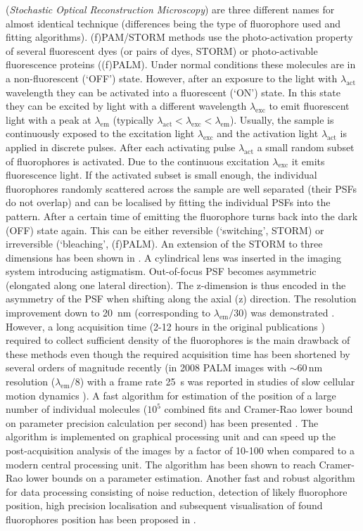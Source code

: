 (\emph{Stochastic Optical Reconstruction Microscopy}) \citep{Rust2006_STORM} are three different names for almost identical technique (differences being the type of fluorophore used and fitting algorithms). (f)PAM/STORM methods use the photo-activation property of several fluorescent dyes (or pairs of dyes, STORM) or photo-activable fluorescence proteins ((f)PALM). Under normal conditions these molecules are in a non-fluorescent (`OFF') state. However, after an exposure to the light with $\lambda_{\mathrm{act}}$ wavelength they can be activated into a fluorescent (`ON') state. In this state they can be excited by light with a different wavelength $\lambda_{\mathrm{exc}}$ to emit fluorescent light with a peak at $\lambda_{\mathrm{em}}$ (typically $\lambda_{\mathrm{act}}<\lambda_{\mathrm{exc}}<\lambda_{\mathrm{em}}$). Usually, the sample is continuously exposed to the excitation light $\lambda_{\mathrm{exc}}$ and the activation light $\lambda_{\mathrm{act}}$ is applied in discrete pulses. After each activating pulse $\lambda_{\mathrm{act}}$ a small random subset of fluorophores is activated. Due to the continuous excitation $\lambda_{\mathrm{exc}}$ it emits fluorescence light. If the activated subset is small enough, the individual fluorophores randomly scattered across the sample are well separated (their PSFs do not overlap) and can be localised by fitting the individual PSFs into the pattern. After a certain time of emitting the fluorophore turns back into the dark (OFF) state again. This can be either reversible (`switching', STORM) or irreversible (`bleaching', (f)PALM). An extension of the STORM to three dimensions has been shown in \citep{Huang2008}. A cylindrical lens was inserted in the imaging system introducing astigmatism. Out-of-focus PSF becomes asymmetric (elongated along one lateral direction). The z-dimension is thus encoded in the asymmetry of the PSF when shifting along the axial (z) direction. The resolution improvement down to 20~nm (corresponding to $\lambda_{\mathrm{em}}/30$) was demonstrated \citep{Betzig2006,Rust2006_STORM}. However, a long acquisition time (2-12 hours in the original publications \citep{Betzig2006}) required to collect sufficient density of the fluorophores is the main drawback of these methods even though the required acquisition time has been shortened by several orders of magnitude recently (in 2008 PALM images with $\sim60\,\mathrm{nm}$ resolution ($\lambda_{\mathrm{em}}/8$) with a frame rate 25~s was reported in studies of slow cellular motion dynamics \citep{Shroff2008LiveFPALM}). A fast algorithm for estimation of the position of a large number of individual molecules ($10^{5}$ combined fits and Cramer-Rao lower bound on parameter precision calculation per second) has been presented \citep{Smith2010}. The algorithm is implemented on graphical processing unit and can speed up the post-acquisition analysis of the images by a factor of 10-100 when compared to a modern central processing unit. The algorithm has been shown to reach Cramer-Rao lower bounds on a parameter estimation. Another fast and robust algorithm for data processing consisting of noise reduction, detection of likely fluorophore position, high precision localisation and subsequent visualisation of found fluorophores position has been proposed in \citep{Wolter2010}. 